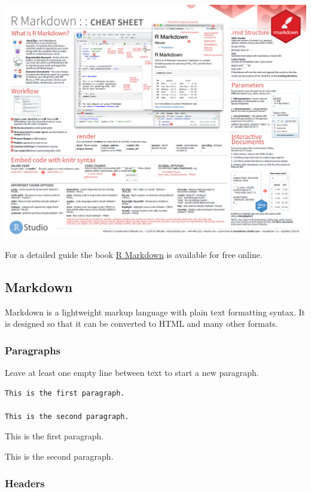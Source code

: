 \documentclass[]{book}
\begin{document}
\href{https://www.rstudio.com/wp-content/uploads/2015/03/rmarkdown-reference.pdf}{\includegraphics{images/rmarkdown.png}}

For a detailed guide the book \href{https://bookdown.org/yihui/rmarkdown/}{R Markdown} is available for
free online.

\hypertarget{markdown}{%
\subsection{Markdown}\label{markdown}}

Markdown is a lightweight markup language with plain text formatting syntax. It is
designed so that it can be converted to HTML and many other formats.

\hypertarget{paragraphs}{%
\subsubsection{Paragraphs}\label{paragraphs}}

Leave at least one empty line between text to start a new paragraph.

\begin{verbatim}
This is the first paragraph.

This is the second paragraph.
\end{verbatim}

This is the first paragraph.

This is the second paragraph.

\hypertarget{headers}{%
\subsubsection{Headers}\label{headers}}
\end{document}

